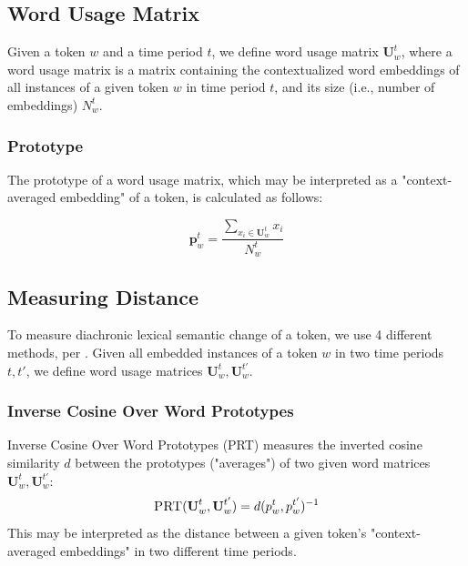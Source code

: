 \documentclass[10pt, a4paper]{article}
\begin{document}
\subsection{Word Usage Matrix}
Given a token $w$ and a time period $t$, we define word usage matrix $\textbf{U}^{t}_w$, where a word usage matrix is a matrix containing the contextualized word embeddings of all instances of a given token $w$ in time period $t$, and its size (i.e., number of embeddings) $N^t_w$.

\subsubsection{Prototype}
The prototype of a word usage matrix, which may be interpreted as a "context-averaged embedding" of a token, is calculated as follows:

$$\textbf{p}^t_w = \frac{\sum_{x_i \in \textbf{U}^t_w} x_i}{N^t_w}$$

\subsection{Measuring Distance}
\label{distance}
To measure diachronic lexical semantic change of a token, we use 4 different methods, per . Given all embedded instances of a token $w$ in two time periods $t, t'$, we define word usage matrices $\textbf{U}^{t}_w, \textbf{U}^{t'}_w$.

\subsubsection{Inverse Cosine Over Word Prototypes}
Inverse Cosine Over Word Prototypes (PRT) measures the inverted cosine similarity $d$ between the prototypes ("averages") of two given word matrices $\textbf{U}^{t}_w, \textbf{U}^{t'}_w$:
$$\textsc{PRT}(\textbf{U}^{t}_w, \textbf{U}^{t'}_w) = d(p^{t}_w, p^{t'}_w)^{-1}$$
This may be interpreted as the distance between a given token's "context-averaged embeddings" in two different time periods.
\end{document}
